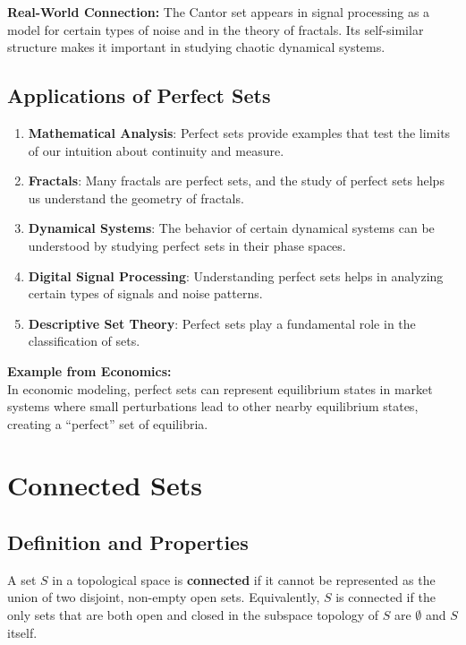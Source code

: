 \documentclass{article}
\begin{document}
\textbf{Real-World Connection:} The Cantor set appears in signal processing as a model for certain types of noise and in the theory of fractals. Its self-similar structure makes it important in studying chaotic dynamical systems.

\subsection{Applications of Perfect Sets} \label{perfect-sets-applications}

\begin{enumerate}[label=\textbf{\arabic*.}]
    \item \textbf{Mathematical Analysis}: Perfect sets provide examples that test the limits of our intuition about continuity and measure.
    \item \textbf{Fractals}: Many fractals are perfect sets, and the study of perfect sets helps us understand the geometry of fractals.
    \item \textbf{Dynamical Systems}: The behavior of certain dynamical systems can be understood by studying perfect sets in their phase spaces.
    \item \textbf{Digital Signal Processing}: Understanding perfect sets helps in analyzing certain types of signals and noise patterns.
    \item \textbf{Descriptive Set Theory}: Perfect sets play a fundamental role in the classification of sets.
\end{enumerate}

\textbf{Example from Economics:} \\
In economic modeling, perfect sets can represent equilibrium states in market systems where small perturbations lead to other nearby equilibrium states, creating a ``perfect'' set of equilibria.

\bigskip

\section{Connected Sets} \label{connected-sets}

\subsection{Definition and Properties} \label{connected-sets-definition}

A set $S$ in a topological space is \textbf{connected} if it cannot be represented as the union of two disjoint, non-empty open sets. Equivalently, $S$ is connected if the only sets that are both open and closed in the subspace topology of $S$ are $\emptyset$ and $S$ itself.
\end{document}
